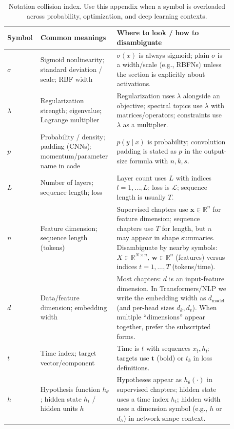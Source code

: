 \begin{table}[h]
\centering
\small
\caption{Notation collision index. Use this appendix when a symbol is overloaded across probability, optimization, and deep learning contexts.}
{\setlength{\tabcolsep}{4pt}%
\renewcommand{\arraystretch}{1.15}%
\begin{tabular}{@{}>{\raggedright\arraybackslash}p{0.12\linewidth} >{\raggedright\arraybackslash}p{0.30\linewidth} >{\raggedright\arraybackslash}p{0.50\linewidth}@{}}
\textbf{Symbol} & \textbf{Common meanings} & \textbf{Where to look / how to disambiguate} \\
\hline
\(\sigma\) & Sigmoid nonlinearity; standard deviation / scale; RBF width & \(\sigma(x)\) is always sigmoid; plain \(\sigma\) is a width/scale (e.g., RBFNs) unless the section is explicitly about activations. \\
\(\lambda\) & Regularization strength; eigenvalue; Lagrange multiplier & Regularization uses \(\lambda\) alongside an objective; spectral topics use \(\lambda\) with matrices/operators; constraints use \(\lambda\) as a multiplier. \\
\(p\) & Probability / density; padding (CNNs); momentum/\allowbreak parameter name in code & \(p(y\mid x)\) is probability; convolution padding is stated as \(p\) in the output-size formula with \(n, k, s\). \\
\(L\) & Number of layers; sequence length; loss & Layer count uses \(L\) with indices \(l=1,\dots, L\); loss is \(\mathcal{L}\); sequence length is usually \(T\). \\
\(n\) & Feature dimension; sequence length (tokens) & Supervised chapters use \(\mathbf{x}\in\mathbb{R}^n\) for feature dimension; sequence chapters use \(T\) for length, but \(n\) may appear in shape summaries. Disambiguate by nearby symbols: \(X\in\mathbb{R}^{N\times n}\), \(\mathbf{w}\in\mathbb{R}^n\) (features) versus indices \(t=1,\ldots,T\) (tokens/time). \\
\(d\) & Data/feature dimension; embedding width & Most chapters: \(d\) is an input-feature dimension. In Transformers/NLP we write the embedding width as \(d_{\text{model}}\) (and per-head sizes \(d_k,d_v\)). When multiple ``dimensions'' appear together, prefer the subscripted forms. \\
\(t\) & Time index; target vector/component & Time is \(t\) with sequences \(x_t, h_t\); targets use \(\mathbf{t}\) (bold) or \(t_k\) in loss definitions. \\
\(h\) & Hypothesis function \(h_\theta\); hidden state \(h_t\) / hidden units \(h\) & Hypotheses appear as \(h_\theta(\cdot)\) in supervised chapters; hidden state uses a time index \(h_t\); hidden width uses a dimension symbol (e.g., \(h\) or \(d_h\)) in network-shape context. \\

\end{tabular}}
\end{table}
